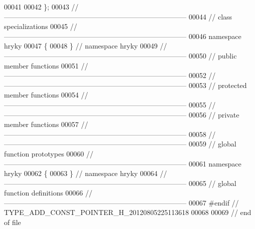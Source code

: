 \begin{DoxyCode}
00041 
00042 \};
00043 \textcolor{comment}{//
      ------------------------------------------------------------------------------}
00044 \textcolor{comment}{// class specializations}
00045 \textcolor{comment}{//
      ------------------------------------------------------------------------------}
00046 \textcolor{keyword}{namespace }hryky
00047 \{
00048 \} \textcolor{comment}{// namespace hryky}
00049 \textcolor{comment}{//
      ------------------------------------------------------------------------------}
00050 \textcolor{comment}{// public member functions}
00051 \textcolor{comment}{//
      ------------------------------------------------------------------------------}
00052 \textcolor{comment}{//
      ------------------------------------------------------------------------------}
00053 \textcolor{comment}{// protected member functions}
00054 \textcolor{comment}{//
      ------------------------------------------------------------------------------}
00055 \textcolor{comment}{//
      ------------------------------------------------------------------------------}
00056 \textcolor{comment}{// private member functions}
00057 \textcolor{comment}{//
      ------------------------------------------------------------------------------}
00058 \textcolor{comment}{//
      ------------------------------------------------------------------------------}
00059 \textcolor{comment}{// global function prototypes}
00060 \textcolor{comment}{//
      ------------------------------------------------------------------------------}
00061 \textcolor{keyword}{namespace }hryky
00062 \{
00063 \} \textcolor{comment}{// namespace hryky}
00064 \textcolor{comment}{//
      ------------------------------------------------------------------------------}
00065 \textcolor{comment}{// global function definitions}
00066 \textcolor{comment}{//
      ------------------------------------------------------------------------------}
00067 \textcolor{preprocessor}{#endif // TYPE\_ADD\_CONST\_POINTER\_H\_20120805225113618}
00068 \textcolor{preprocessor}{}
00069 \textcolor{comment}{// end of file}
\end{DoxyCode}
